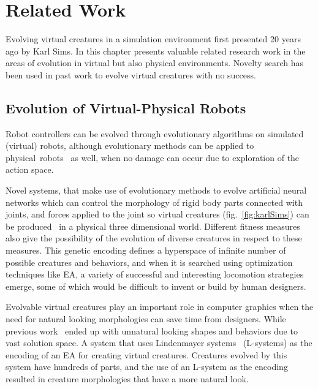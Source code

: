 
\chapter{Related Work} %

\label{Related Work} %


Evolving virtual creatures in a simulation environment first presented 20 years ago by Karl Sims. In this chapter presents valuable related research work in the areas of evolution in virtual but also physical environments. Novelty search has been used in past work to evolve virtual creatures with no success.


\section{Evolution of Virtual-Physical Robots}

Robot controllers can be evolved through evolutionary algorithms on simulated (virtual) robots, although evolutionary methods can be applied to physical~robots~\cite{nolfi1994evolve} as well, when no damage can occur due to exploration of the action space. 

Novel systems, that make use of evolutionary methods to evolve artificial neural networks which can control the morphology of rigid body parts connected with joints, and forces applied to the joint so virtual creatures (fig.~\ref{fig:karlSims}) can be produced~\cite{sims1994evolving} in a physical three dimensional world. Different fitness measures also give the possibility of the evolution of diverse creatures in respect to these measures. This genetic encoding defines a hyperspace of infinite number of possible creatures and behaviors, and when it is searched using optimization techniques like EA, a variety of successful and interesting locomotion strategies emerge, some of which would be difficult to invent or build by human designers.

Evolvable virtual creatures play an important role in computer graphics when the need for natural looking morphologies can save time from designers. While previous work~\cite{lipson2000automatic} ended up with unnatural looking shapes and behaviors due to vast solution space. A system that uses Lindenmayer systems~\cite{hornby2001evolving} (L-systems) as the encoding of an EA for creating virtual creatures. Creatures evolved by this system have hundreds of parts, and the use of an L-system as the encoding resulted in creature morphologies that have a more natural look.

